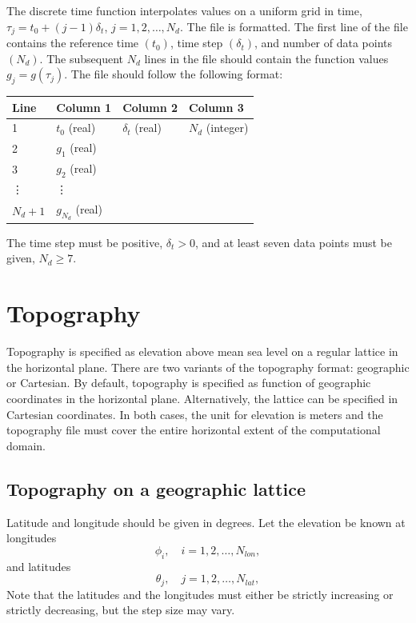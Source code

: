 \documentclass[11pt]{report}
\begin{document}
The discrete time function interpolates values on a uniform grid in time, $\tau_j = t_0 +
(j-1)\delta_t$, $j=1,2,\ldots,N_d$. The file is formatted. The first line of the file contains the
reference time $(t_0)$, time step $(\delta_t)$, and number of data points $(N_d)$. The subsequent
$N_d$ lines in the file should contain the function values $g_j = g(\tau_j)$. The file should follow
the following format:
\begin{center}
\begin{tabular}{llll}\hline
Line & Column 1& Column 2& Column 3\\ \hline
1 & $t_0$ (real) & $\delta_t$ (real) & $N_d$ (integer) \\ \hline
2 & $g_1$ (real) & & \\ \hline
3 & $g_2$ (real) & & \\ \hline
\vdots & \vdots & & \\ \hline
$N_d + 1$ & $g_{N_d}$ (real) & & \\ \hline
\end{tabular}
\end{center}
The time step must be positive, $\delta_t>0$, and at least seven data points must be given, $N_d\geq
7$.

\section{Topography}\label{sec:topo-file-format}

Topography is specified as elevation above mean sea level on a regular lattice in the horizontal
plane. There are two variants of the topography format: geographic or Cartesian. By default,
topography is specified as function of geographic coordinates in the horizontal
plane. Alternatively, the lattice can be specified in Cartesian coordinates. In both cases, the unit
for elevation is meters and the topography file must cover the entire horizontal extent of the
computational domain.

\subsection{Topography on a geographic lattice}
Latitude and longitude should be given in degrees. Let the elevation be known at longitudes
\[
\phi_i,\quad i=1,2,\ldots,N_{lon},
\]
and latitudes
\[
\theta_j,\quad j=1,2,\ldots,N_{lat},
\]
Note that the latitudes and the longitudes must either be strictly increasing or strictly
decreasing, but the step size may vary.
\end{document}
